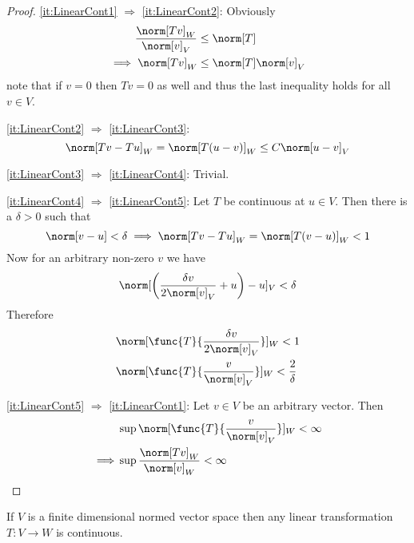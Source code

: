 \begin{proof}
    \cref{it:LinearCont1} \(\Rightarrow\) \cref{it:LinearCont2}: Obviously
    \begin{align*}
        \dfrac{\norm[Tv]_W}{\norm[v]_V} & \leq \norm[T]            \\
        \implies \norm[Tv]_W            & \leq \norm[T] \norm[v]_V
    \end{align*}
    note that if \(v = 0\) then \(Tv = 0\) as well and thus the last inequality holds for all \(v \in V\).

    \cref{it:LinearCont2} \(\Rightarrow\) \cref{it:LinearCont3}:
    \begin{equation*}
        \norm[Tv - Tu]_W = \norm[T(u - v)]_W \leq C \norm[u - v]_V
    \end{equation*}

    \cref{it:LinearCont3} \(\Rightarrow\) \cref{it:LinearCont4}: Trivial.

    \cref{it:LinearCont4} \(\Rightarrow\) \cref{it:LinearCont5}: Let \(T\) be continuous at \(u \in V\). Then there is  a \(\delta > 0 \) such that
    \begin{equation*}
        \norm[v-u] < \delta \implies \norm[Tv - Tu]_W = \norm[T(v-u)]_W < 1
    \end{equation*}
    Now for an arbitrary non-zero \(v\) we have
    \begin{equation*}
        \norm[\left( \dfrac{\delta v}{2\norm[v]_V} + u \right) - u]_V < \delta
    \end{equation*}
    Therefore
    \begin{align*}
         & \norm[\func{T}{\dfrac{\delta v}{2\norm[v]_V}}]_W  < 1         \\
         & \norm[\func{T}{\dfrac{v}{\norm[v]_V}}]_W  < \dfrac{2}{\delta}
    \end{align*}

    \cref{it:LinearCont5} \(\Rightarrow\) \cref{it:LinearCont1}: Let \(v \in V\) be an arbitrary vector. Then
    \begin{align*}
                 & \sup \norm[\func{T}{\dfrac{v}{\norm[v]_V}}]_W < \infty \\
        \implies & \sup \dfrac{\norm[Tv]_W}{\norm[v]_W} < \infty
    \end{align*}

\end{proof}




\begin{theorem} \label{th:finiteDimensionTransformationContinuous}
    If \(V\) is a finite dimensional normed vector space then any linear transformation \(T : V \to W\) is continuous.
\end{theorem}

